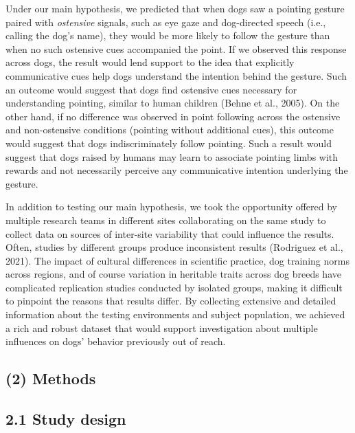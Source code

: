 \documentclass[
  pub,floatsintext]{apa6}
\begin{document}
Under our main hypothesis, we predicted that when dogs saw a pointing gesture paired with \emph{ostensive} signals, such as eye gaze and dog-directed speech (i.e., calling the dog's name), they would be more likely to follow the gesture than when no such ostensive cues accompanied the point. If we observed this response across dogs, the result would lend support to the idea that explicitly communicative cues help dogs understand the intention behind the gesture. Such an outcome would suggest that dogs find ostensive cues necessary for understanding pointing, similar to human children (Behne et al., 2005). On the other hand, if no difference was observed in point following across the ostensive and non-ostensive conditions (pointing without additional cues), this outcome would suggest that dogs indiscriminately follow pointing. Such a result would suggest that dogs raised by humans may learn to associate pointing limbs with rewards and not necessarily perceive any communicative intention underlying the gesture.

In addition to testing our main hypothesis, we took the opportunity offered by multiple research teams in different sites collaborating on the same study to collect data on sources of inter-site variability that could influence the results. Often, studies by different groups produce inconsistent results (Rodriguez et al., 2021). The impact of cultural differences in scientific practice, dog training norms across regions, and of course variation in heritable traits across dog breeds have complicated replication studies conducted by isolated groups, making it difficult to pinpoint the reasons that results differ. By collecting extensive and detailed information about the testing environments and subject population, we achieved a rich and robust dataset that would support investigation about multiple influences on dogs' behavior previously out of reach.

\hypertarget{methods}{%
\subsection{(2) Methods}\label{methods}}

\hypertarget{study-design}{%
\subsection{2.1 Study design}\label{study-design}}
\end{document}
